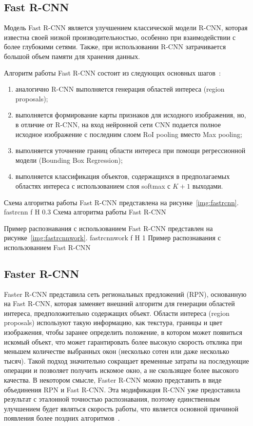 \subsection{Fast R-CNN}

Модель Fast R-CNN является улучшением классической модели R-CNN, которая известна своей низкой производительностью, особенно при взаимодействии с более глубокими сетями.
Также, при использовании R-CNN затрачивается большой объем памяти для хранения данных.

Алгоритм работы Fast R-CNN состоит из следующих основных шагов~\cite{yolochina, rcnn}:
\begin{enumerate}
	\item аналогично R-CNN выполняется генерация областей интереса (region proposals);
	\item выполняется формирование карты признаков для исходного изображения, но, в отличие от R-CNN, на вход нейронной сети CNN подается полное исходное изображение с последним слоем RoI pooling вместо Max pooling;
	\item выполняется уточнение границ области интереса при помощи регрессионной модели (Bounding Box Regression);
	\item выполняется классификация объектов, содержащихся в предполагаемых областях интереса с использованием слоя softmax с $K+1$ выходами.
\end{enumerate}

\clearpage
Схема алгоритма работы Fast R-CNN представлена на рисунке~\ref{img:fastrcnn}.
	{fastrcnn}
	{f}
	{H}
	{0.3\textwidth}
	{Схема алгоритма работы Fast R-CNN}

Пример распознавания с использованием Fast R-CNN представлен на рисунке~\ref{img:fastrcnnwork}.
	{fastrcnnwork}
	{f}
	{H}
	{1\textwidth}
	{Пример распознавания с использованием Fast R-CNN}

\clearpage

\subsection{Faster R-CNN}

Faster R-CNN представила сеть региональных предложений (RPN), основанную на Fast R-CNN, которая заменяет внешний алгоритм для генерации областей интереса, предположительно содержащих объект.
Области интереса (region proposals) используют такую информацию, как текстура, границы и цвет изображения, чтобы заранее определить положение, в котором может появиться искомый объект, что может гарантировать более высокую скорость отклика при меньшем количестве выбранных окон (несколько сотен или даже несколько тысяч).
Такой подход значительно сокращает временные затраты на последующие операции и позволяет получить искомое окно, а не скользящее более высокого качества.
В некотором смысле, Faster R-CNN можно представить в виде объединения RPN и Fast R-CNN.
Эта модификация R-CNN уже предоставила результат с эталонной точностью распознавания, поэтому единственным улучшением будет являться скорость работы, что является основной причиной появления более поздних алгоритмов~\cite{fasterrcnn}.

